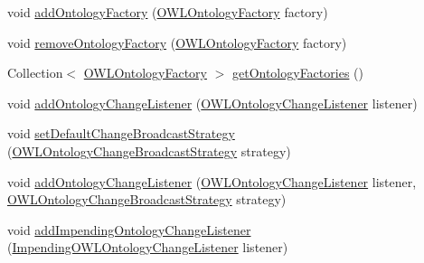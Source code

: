 \begin{DoxyCompactItemize}
\item 
void \hyperlink{classuk_1_1ac_1_1manchester_1_1cs_1_1owl_1_1owlapi_1_1_o_w_l_ontology_manager_impl_a14f3e93f9d0ec0341edb9c0968befe03}{add\-Ontology\-Factory} (\hyperlink{interfaceorg_1_1semanticweb_1_1owlapi_1_1model_1_1_o_w_l_ontology_factory}{O\-W\-L\-Ontology\-Factory} factory)
\item 
void \hyperlink{classuk_1_1ac_1_1manchester_1_1cs_1_1owl_1_1owlapi_1_1_o_w_l_ontology_manager_impl_a7e7df3915fe54615967cd99dfbb3e6fa}{remove\-Ontology\-Factory} (\hyperlink{interfaceorg_1_1semanticweb_1_1owlapi_1_1model_1_1_o_w_l_ontology_factory}{O\-W\-L\-Ontology\-Factory} factory)
\item 
Collection$<$ \hyperlink{interfaceorg_1_1semanticweb_1_1owlapi_1_1model_1_1_o_w_l_ontology_factory}{O\-W\-L\-Ontology\-Factory} $>$ \hyperlink{classuk_1_1ac_1_1manchester_1_1cs_1_1owl_1_1owlapi_1_1_o_w_l_ontology_manager_impl_a9b17c071e8561947fd0ace8a53aae4e8}{get\-Ontology\-Factories} ()
\item 
void \hyperlink{classuk_1_1ac_1_1manchester_1_1cs_1_1owl_1_1owlapi_1_1_o_w_l_ontology_manager_impl_a8a8d418b5b03f40531afd97d503812aa}{add\-Ontology\-Change\-Listener} (\hyperlink{interfaceorg_1_1semanticweb_1_1owlapi_1_1model_1_1_o_w_l_ontology_change_listener}{O\-W\-L\-Ontology\-Change\-Listener} listener)
\item 
void \hyperlink{classuk_1_1ac_1_1manchester_1_1cs_1_1owl_1_1owlapi_1_1_o_w_l_ontology_manager_impl_aa98a9590745609f4416241ccff0e6f0a}{set\-Default\-Change\-Broadcast\-Strategy} (\hyperlink{interfaceorg_1_1semanticweb_1_1owlapi_1_1model_1_1_o_w_l_ontology_change_broadcast_strategy}{O\-W\-L\-Ontology\-Change\-Broadcast\-Strategy} strategy)
\item 
void \hyperlink{classuk_1_1ac_1_1manchester_1_1cs_1_1owl_1_1owlapi_1_1_o_w_l_ontology_manager_impl_ad4f0463034e1645b6d70c22b21a243cf}{add\-Ontology\-Change\-Listener} (\hyperlink{interfaceorg_1_1semanticweb_1_1owlapi_1_1model_1_1_o_w_l_ontology_change_listener}{O\-W\-L\-Ontology\-Change\-Listener} listener, \hyperlink{interfaceorg_1_1semanticweb_1_1owlapi_1_1model_1_1_o_w_l_ontology_change_broadcast_strategy}{O\-W\-L\-Ontology\-Change\-Broadcast\-Strategy} strategy)
\item 
void \hyperlink{classuk_1_1ac_1_1manchester_1_1cs_1_1owl_1_1owlapi_1_1_o_w_l_ontology_manager_impl_a5ad1a5e4a4d8f5eb3199a170980825c1}{add\-Impending\-Ontology\-Change\-Listener} (\hyperlink{interfaceorg_1_1semanticweb_1_1owlapi_1_1model_1_1_impending_o_w_l_ontology_change_listener}{Impending\-O\-W\-L\-Ontology\-Change\-Listener} listener)

\end{DoxyCompactItemize}
